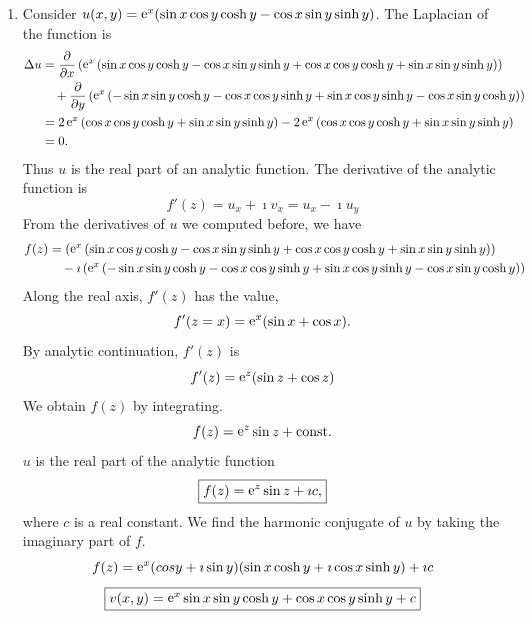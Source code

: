 {\begin{Solution}
\begin{enumerate}
    function.
  \item
    Consider $u(x,y) = \mathop{\mathrm{e}}\nolimits^x ( \sin x \cos y \cosh y - \cos x \sin y \sinh y )$.
    The Laplacian of the function is
    \begin{align*}
      \Delta u &= \frac{\partial}{\partial x} \left(
        \mathop{\mathrm{e}}\nolimits^x \left( \sin x \cos y \cosh y - \cos x \sin y \sinh y
        + \cos x \cos y \cosh y + \sin x \sin y \sinh y \right) \right) 
    \\
      & \quad + \frac{\partial}{\partial y} \left(
        \mathop{\mathrm{e}}\nolimits^x \left( - \sin x \sin y \cosh y - \cos x \cos y \sinh y
        +  \sin x \cos y \sinh y - \cos x \sin y \cosh y \right) \right) 
    \\
      &= 2 \mathop{\mathrm{e}}\nolimits^x \left( \cos x \cos y \cosh y + \sin x \sin y \sinh y \right)
      - 2 \mathop{\mathrm{e}}\nolimits^x \left( \cos x \cos y \cosh y + \sin x \sin y \sinh y \right)
      \\
      &= 0.
    \end{align*}
    Thus $u$ is the real part of an analytic function.  The derivative of
    the analytic function is
    \[
    f'(z) = u_x + \imath v_x = u_x - \imath u_y
    \]
    From the derivatives of $u$ we computed before, we have
    \begin{align*}
      f(z) &= \left( \mathop{\mathrm{e}}\nolimits^x \left( \sin x \cos y \cosh y - \cos x \sin y \sinh y
        + \cos x \cos y \cosh y + \sin x \sin y \sinh y \right) \right) 
    \\
      & \quad - \imath \left(
        \mathop{\mathrm{e}}\nolimits^x \left( - \sin x \sin y \cosh y - \cos x \cos y \sinh y
        +  \sin x \cos y \sinh y - \cos x \sin y \cosh y \right) \right)
    \end{align*}
    Along the real axis, $f'(z)$ has the value,
    \[
    f'(z = x) = \mathop{\mathrm{e}}\nolimits^x ( \sin x + \cos x ).
    \]
    By analytic continuation, $f'(z)$ is
    \[
    f'(z) = \mathop{\mathrm{e}}\nolimits^z ( \sin z + \cos z )
    \]
    We obtain $f(z)$ by integrating.
    \[
    f(z) = \mathop{\mathrm{e}}\nolimits^z \sin z + \mathrm{const}.
    \]
    $u$ is the real part of the analytic function
    \[
    \boxed{
      f(z) = \mathop{\mathrm{e}}\nolimits^z \sin z + \imath c,
      }
    \]
    where $c$ is a real constant.  We find the harmonic conjugate of 
    $u$ by taking the imaginary part of $f$.
    \[
    f(z) = \mathop{\mathrm{e}}\nolimits^x ( cos y + \imath \sin y ) ( \sin x \cosh y + \imath \cos x \sinh y ) 
    + \imath c
    \]
    \[
    \boxed{
      v(x,y) = \mathop{\mathrm{e}}\nolimits^x \sin x \sin y \cosh y + \cos x \cos y \sinh y + c
      }
    \]
  \end{enumerate}
\end{Solution}







}
